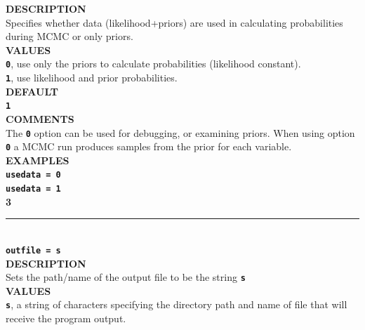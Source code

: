 \documentclass{book}
\numberwithin{equation}{section} \renewcommand{\baselinestretch}{0.55}
\begin{document}
\textbf{DESCRIPTION} \vspace{5pt}\\
Specifies whether data (likelihood+priors) are used in calculating probabilities during MCMC or only priors.\vspace{5pt}\\
\textbf{VALUES} \vspace{5pt}\\
\textbf{\texttt{0}}, use only the priors to calculate probabilities (likelihood constant).\vspace{5pt}\\
\textbf{\texttt{1}}, use likelihood and prior probabilities. \vspace{5pt}\\
\textbf{DEFAULT}\vspace{5pt}\\
\textbf{\texttt{1}} \vspace{5pt}\\
\textbf{COMMENTS} \vspace{5pt}\\
The \textbf{\texttt{0}} option can be used for debugging, or examining priors. When using option \textbf{\texttt{0}} a MCMC run produces samples from the prior for each variable. \vspace{5pt}\\
\textbf{EXAMPLES} \vspace{5pt}\\
\textbf{\texttt{usedata = 0}} \vspace{5pt}\\
\textbf{\texttt{usedata = 1}} \vspace{10pt}\\
\newpage
\noindent\textbf{{\large 3}} \\
\noindent\rule{\textwidth}{0.8pt} \\
\textbf{{\Large \texttt{outfile = s}}} \vspace{5pt}\\
\textbf{DESCRIPTION} \vspace{5pt}\\
Sets the path/name of the output file to be the string \textbf{\texttt{s}} \vspace{5pt}\\
\textbf{VALUES} \vspace{5pt}\\
\textbf{\texttt{s}}, a string of characters specifying the directory path and name of file that will receive the program output. \vspace{5pt}\\
\end{document}
